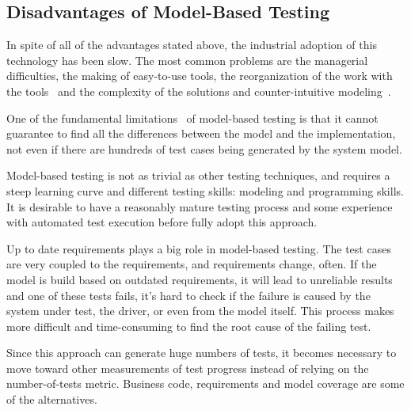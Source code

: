 \subsection{Disadvantages of Model-Based Testing}

In spite of all of the advantages stated above, the industrial adoption of this technology has been slow. The most common problems are the managerial difficulties, the making of easy-to-use tools, the reorganization of the work with the tools~\cite{Robinson2013} and the complexity of the solutions and counter-intuitive modeling~\cite{Jääskeläinen2008}.

One of the fundamental limitations~\cite{1200168} of model-based testing is that it cannot guarantee to find all the differences between the model and the implementation, not even if there are hundreds of test cases being generated by the system model.

Model-based testing is not as trivial as other testing techniques, and requires a steep learning curve and different testing skills: modeling and programming skills. It is desirable to have a reasonably mature testing process and some experience with automated test execution before fully adopt this approach.

Up to date requirements plays a big role in model-based testing. The test cases are very coupled to the requirements, and requirements change, often. If the model is build based on outdated requirements, it will lead to unreliable results and one of these tests fails, it's hard to check if the failure is caused by the system under test, the driver, or even from the model itself. This process makes more difficult and time-consuming to find the root cause of the failing test.

Since this approach can generate huge numbers of tests, it becomes necessary to move toward other measurements of test progress instead of relying on the number-of-tests metric. Business code, requirements and model coverage are some of the alternatives.

